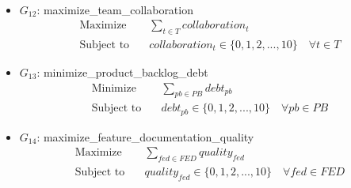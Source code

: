 \documentclass{article}
\begin{document}
\begin{itemize}
\begin{align*}
        \end{align*}
    \item $G_{12}$: maximize\_team\_collaboration
        \begin{align*}
            \text{Maximize} \quad &\sum_{t \in T} collaboration_t \\
            \text{Subject to} \quad &collaboration_t \in \{0, 1, 2, ..., 10\} \quad \forall t \in T
        \end{align*}
    \item $G_{13}$: minimize\_product\_backlog\_debt
        \begin{align*}
            \text{Minimize} \quad &\sum_{pb \in PB} debt_{pb} \\
            \text{Subject to} \quad &debt_{pb} \in \{0, 1, 2, ..., 10\} \quad \forall pb \in PB
        \end{align*}
    \item $G_{14}$: maximize\_feature\_documentation\_quality
        \begin{align*}
            \text{Maximize} \quad &\sum_{fed \in FED} quality_{fed} \\
            \text{Subject to} \quad &quality_{fed} \in \{0, 1, 2, ..., 10\} \quad \forall fed \in FED
        \end{align*}
\end{itemize}
\end{document}
